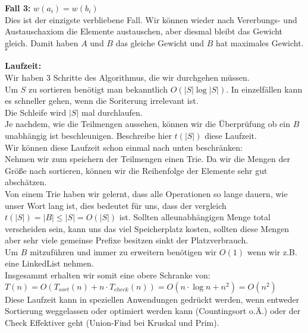 \documentclass[11pt,a4paper,ngerman]{article}
\begin{document}
\begin{enumerate}[\bfseries (a)]
\textbf{Fall 3:} $w(a_i) = w(b_i)$\\
Dies ist der einzigste verbliebene Fall. Wir können wieder nach Vererbungs- und Austauschaxiom die Elemente austauschen, aber diesmal bleibt das Gewicht gleich. Damit haben $A$ und $B$ das gleiche Gewicht und $B$ hat maximales Gewicht.\\
\mbox{} \hfill $\square$

\textbf{Laufzeit:}\\

Wir haben 3 Schritte des Algorithmus, die wir durchgehen müssen.\\

Um $S$ zu sortieren benötigt man bekanntlich $O ( |S| \log |S|) $. In einzelfällen kann es schneller gehen, wenn die Soriterung irrelevant ist.\\

Die Schleife wird $|S|$ mal durchlaufen.\\
Je nachdem, wie die Teilmengen aussehen, können wir die Überprüfung ob ein $B$ unabhängig ist beschleunigen. Beschreibe hier $t(|S|)$ diese Laufzeit.\\
Wir können diese Laufzeit schon einmal nach unten beschränken:\\

Nehmen wir zum speichern der Teilmengen einen Trie. Da wir die Mengen der Größe nach sortieren, können wir die Reihenfolge der Elemente sehr gut abschätzen.\\
Von einem Trie haben wir gelernt, dass alle Operationen so lange dauern, wie unser Wort lang ist, dies bedeutet für uns, dass der vergleich $t(|S|) = |B| \leq |S| = O (|S| )$ ist. Sollten alleunabhängigen Menge total verscheiden sein, kann uns das viel Speicherplatz kosten, sollten diese Mengen aber sehr viele gemeinse Prefixe besitzen sinkt der Platzverbrauch.\\

Um $B$ mitzuführen und immer zu erweitern benötigen wir $O(1)$ wenn wir z.B. eine LinkedList nehmen.\\

Insgesammt erhalten wir somit eine obere Schranke von:\\
$T(n) = O( T_{sort}(n) + n \cdot T_{check} (n) ) = O(n \cdot \log n + n^2) = O(n^2)$\\

Diese Laufzeit kann in speziellen Anwendungen gedrückt werden, wenn entweder Sortierung weggelassen oder optimiert werden kann (Countingsort o.Ä.) oder der Check Effektiver geht (Union-Find bei Kruskal und Prim).
\end{enumerate}

\label{LastPage}
\end{document}
